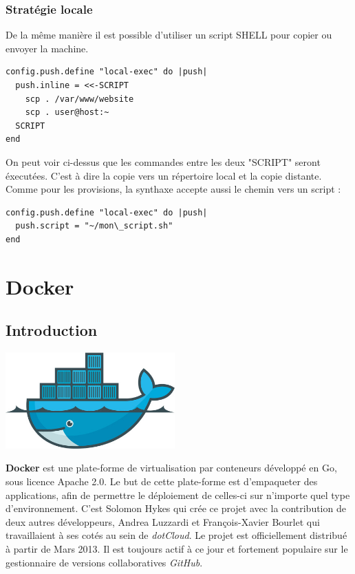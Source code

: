 \documentclass[12pt,a4paper]{article}
\begin{document}
\subsubsection{Stratégie locale}
De la même manière il est possible d'utiliser un script SHELL pour copier ou envoyer la machine.
\begin{lstlisting}
config.push.define "local-exec" do |push|
  push.inline = <<-SCRIPT
    scp . /var/www/website
	scp . user@host:~
  SCRIPT
end
\end{lstlisting}
On peut voir ci-dessus que les commandes entre les deux "SCRIPT" seront éxecutées. C'est à dire la copie vers un répertoire local et la copie distante. Comme pour les provisions, la synthaxe accepte aussi le chemin vers un script :
\begin{lstlisting}
config.push.define "local-exec" do |push|
  push.script = "~/mon\_script.sh"
end
\end{lstlisting}

\section{Docker}

\subsection{Introduction}
\begin{center}
  \includegraphics[width=6.5cm]{images_rapport/docker_logo.jpg}
\end{center}

\newpage

\textbf{Docker} est une plate-forme de virtualisation par conteneurs développé en Go, sous licence Apache 2.0. Le but de cette plate-forme est d'empaqueter des applications, afin de permettre le déploiement de celles-ci sur n'importe quel type d'environnement. C'est Solomon Hykes qui crée ce projet avec la contribution de deux autres développeurs, Andrea Luzzardi et François-Xavier Bourlet qui travaillaient à ses cotés au sein de \textit{dotCloud}. Le projet est officiellement distribué à partir de Mars 2013. Il est toujours actif à ce jour et fortement populaire sur le gestionnaire de versions collaboratives \textit{GitHub}.
\end{document}
